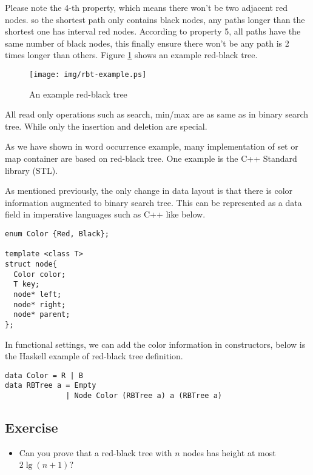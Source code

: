 \documentclass{article}
\begin{document}
Please note the 4-th property, which means there won't be two adjacent 
red nodes. so the shortest path only contains black nodes, any paths 
longer than the shortest one has interval red nodes. According to 
property 5, all paths have the same number of black nodes, 
this finally ensure there won't be any path is 2 times longer than 
others\cite{wiki}. Figure \ref{fig:rbt-example} shows an example
red-black tree.

\begin{figure}[htbp]
       \begin{center}
	\texttt{[image: img/rbt-example.ps]}
        \caption{An example red-black tree} \label{fig:rbt-example}
       \end{center}
\end{figure}

All read only operations such as search, min/max are as same as in 
binary search tree. While only the insertion and deletion are special.

As we have shown in word occurrence example, many implementation of 
set or map container are based on red-black tree. One example is the 
C++ Standard library (STL)\cite{sgi-stl}. 

As mentioned previously, the only change in data layout is that
there is color information augmented to binary search tree.
This can be represented as a data field in imperative languages
such as C++ like below.

\lstset{language=C++}
\begin{lstlisting}
enum Color {Red, Black};

template <class T>
struct node{
  Color color;
  T key;
  node* left;
  node* right;
  node* parent;
};
\end{lstlisting}

In functional settings, we can add the color information
in constructors, below is the Haskell example of red-black tree
definition.

\lstset{language=Haskell}
\begin{lstlisting}
data Color = R | B
data RBTree a = Empty
              | Node Color (RBTree a) a (RBTree a)
\end{lstlisting}

\subsection*{Exercise}

\begin{itemize}
\item Can you prove that a red-black tree with $n$ nodes has
height at most $2 \lg (n+1)$?
\end{itemize}
\end{document}
